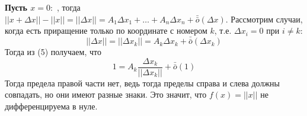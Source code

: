 \documentclass[book, 11pt]{report}
\begin{document}
{        \textbf{Пусть $x=0:$ }, тогда $||x+\Delta x||-||x||=||\Delta x||=A_1\Delta x_1+\ldots+A_n\Delta x_n+\bar{\bar{o}}(\Delta x)$. Рассмотрим случаи, когда есть приращение только по координате с номером $k$, т.е. $\Delta x_i=0$ при $i\ne k$:
        \begin{equation}
            ||\Delta x||=||\Delta x_k||=A_k\Delta x_k+\bar{\bar{o}}(\Delta x_k)
        \end{equation}
        Тогда из (5) получаем, что
        \begin{equation}
            1=A_k\frac{\Delta x_k}{||\Delta x_k||}+\bar{\bar{o}}(1)
        \end{equation}
        Тогда предела правой части нет, ведь тогда пределы справа и слева должны совпадать, но они имеют разные знаки. Это значит, что $f(x)=||x||$ не дифференцируема в нуле.
        }
        \newpage
\end{document}

